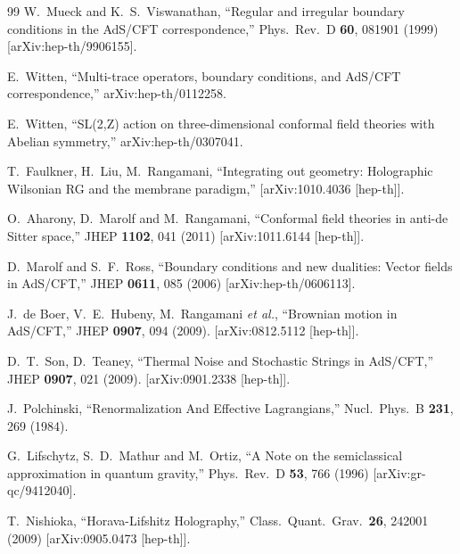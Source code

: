 \documentclass[12pt,epsbox]{article}
\numberwithin{equation}{section}
\begin{document}
\begin{thebibliography}{99}
  W.~Mueck and K.~S.~Viswanathan,
  ``Regular and irregular boundary conditions in the AdS/CFT  correspondence,''
  Phys.\ Rev.\  D {\bf 60}, 081901 (1999)
  [arXiv:hep-th/9906155].

  E.~Witten,
  ``Multi-trace operators, boundary conditions, and AdS/CFT correspondence,''
  arXiv:hep-th/0112258.

  E.~Witten,
  ``SL(2,Z) action on three-dimensional conformal field theories with Abelian symmetry,''
  arXiv:hep-th/0307041.

  T.~Faulkner, H.~Liu, M.~Rangamani,
  ``Integrating out geometry: Holographic Wilsonian RG and the membrane paradigm,''
  [arXiv:1010.4036 [hep-th]].

  O.~Aharony, D.~Marolf and M.~Rangamani,
  ``Conformal field theories in anti-de Sitter space,''
  JHEP {\bf 1102}, 041 (2011)
  [arXiv:1011.6144 [hep-th]].

  D.~Marolf and S.~F.~Ross,
  ``Boundary conditions and new dualities: Vector fields in AdS/CFT,''
  JHEP {\bf 0611}, 085 (2006)
  [arXiv:hep-th/0606113].

  J.~de Boer, V.~E.~Hubeny, M.~Rangamani {\it et al.},
  ``Brownian motion in AdS/CFT,''
  JHEP {\bf 0907}, 094 (2009).
  [arXiv:0812.5112 [hep-th]].
  
  D.~T.~Son, D.~Teaney,
  ``Thermal Noise and Stochastic Strings in AdS/CFT,''
  JHEP {\bf 0907}, 021 (2009).
  [arXiv:0901.2338 [hep-th]].

  J.~Polchinski,
  ``Renormalization And Effective Lagrangians,''
  Nucl.\ Phys.\  B {\bf 231}, 269 (1984).


  G.~Lifschytz, S.~D.~Mathur and M.~Ortiz,
  ``A Note on the semiclassical approximation in quantum gravity,''
  Phys.\ Rev.\  D {\bf 53}, 766 (1996)
  [arXiv:gr-qc/9412040].

  T.~Nishioka,
  ``Horava-Lifshitz Holography,''
  Class.\ Quant.\ Grav.\  {\bf 26}, 242001 (2009)
  [arXiv:0905.0473 [hep-th]].


\end{thebibliography}
\end{document}
